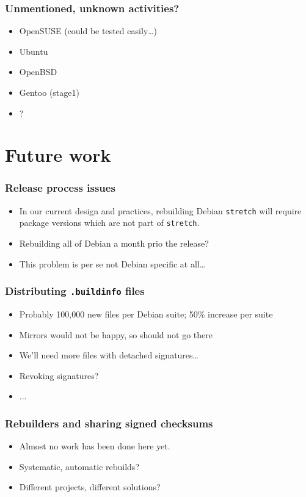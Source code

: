 \documentclass[14pt]{beamer}
\newif\ifplacelogo
\begin{document}
\begin{frame}
 \frametitle{Unmentioned, unknown activities?}
 \begin{itemize}
\item  OpenSUSE (could be tested easily…)
\item  Ubuntu
\item  OpenBSD
\item  Gentoo (stage1)
 \item ?
\end{itemize}
\end{frame}


\placelogotrue

\section{Future work}



\begin{frame}
 \frametitle{Release process issues}
 \begin{itemize}
  \item In our current design and practices, rebuilding Debian
  \texttt{stretch} will require
  package versions which are not part of \texttt{stretch}.
  \item {Rebuilding all of Debian a month prio the release? }
  \item<2> This problem is per se not Debian specific at all…
 \end{itemize}
\end{frame}

\begin{frame}
 \frametitle{Distributing \texttt{.buildinfo} files}
 \begin{itemize}
  \item Probably 100,000 new files per Debian suite; 50\% increase per suite
  \item Mirrors would not be happy, so should not go there
  \item<2> We'll need more files with detached signatures…
  \item<2>{Revoking signatures?}
  \item<2>{...}
 \end{itemize}
\end{frame}

\begin{frame}
 \frametitle{Rebuilders and sharing signed checksums}
 \begin{itemize}
  \item Almost no work has been done here yet.
  \item<2-3> Systematic, automatic rebuilds? 
  \item<3> Different projects, different solutions? 
 \end{itemize}
\end{frame}
\end{document}
